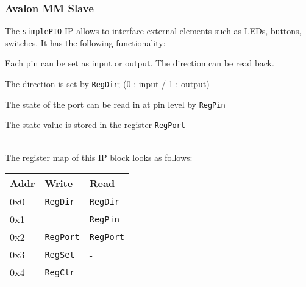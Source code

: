 		\subsubsection{Avalon MM Slave }
			The \texttt{simplePIO}-IP allows to interface external elements such as LEDs, buttons, switches. It has the following functionality:
			\begin{compactitem}
				\item Each pin can be set as input or output. The direction can be read back.
				\item The direction is set by \texttt{RegDir}; (0 : input / 1 : output)
				\item The state of the port can be read in at pin level by \texttt{RegPin}
				\item The state value is stored in the register \texttt{RegPort}
			\end{compactitem} \ \\
		
			The register map of this IP block looks as follows: \\
			\begin{tabular}{|p{0.1\textwidth}|p{}|p{}|}
				\hline
				\textbf{Addr} & \textbf{Write} & \textbf{Read} \\
				\hline
				0x0 & \texttt{RegDir} & \texttt{RegDir} \\ \hline
				0x1 & - & \texttt{RegPin} \\ \hline
				0x2 & \texttt{RegPort} & \texttt{RegPort} \\ \hline
				0x3 & \texttt{RegSet} & - \\ \hline
				0x4 & \texttt{RegClr} & - \\ \hline
			\end{tabular}
			\begin{multicols}{2}		
				
			\end{multicols}			
			
		